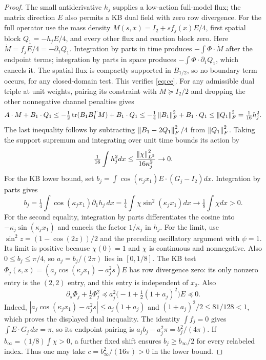 \begin{proof}
The small antiderivative $h_j$ supplies a low-action full-model flux;
the matrix direction $E$ also permits a KB dual field with zero row divergence.
For the full operator use the mass density $M(s,x)=I_2+s f_j(x)E/4$, first spatial block
$Q_1=-h_jE/4$, and every other flux and reaction block zero. Here
$\dot M=f_jE/4=-\partial_1Q_1$. Integration by parts in time produces
$-\int\Phi\cdot\dot M$ after the endpoint terms; integration by parts in
space produces $-\int\Phi\cdot\partial_1Q_1$, which cancels it. The
spatial flux is compactly supported in $B_{1/2}$, so no boundary term
occurs, for any closed-domain test. This verifies \eqref{eq:ce}.
For any admissible dual triple at unit weights, pairing its constraint
with $M\succeq I_2/2$ and dropping the other nonnegative channel penalties
gives
\[
 A\cdot M+B_1\cdot Q_1
 \le-\tfrac12\operatorname{tr}(B_1B_1^TM)+B_1\cdot Q_1
 \le-\tfrac14\left\lVert B_1\right\rVert_F^2+B_1\cdot Q_1
 \le\left\lVert Q_1\right\rVert_F^2=\tfrac1{16}h_j^2.
\]
The last inequality follows by subtracting
$\left\lVert B_1-2Q_1\right\rVert_F^2/4$ from $\left\lVert Q_1\right\rVert_F^2$.
Taking the support supremum and integrating over unit time bounds its action by
\[
 \tfrac1{16}\int h_j^2dx
 \le\frac{\left\lVert \chi\right\rVert_{L^2}^2}{16\kappa_j^2}\to0.
\]
For the KB lower bound, set
$b_j=\int\cos(\kappa_jx_1)E\cdot(G_j-I_2)dx$. Integration by parts gives
\[
 b_j=\tfrac14\int\cos(\kappa_jx_1)\partial_1h_j\,dx
     =\tfrac14\int\chi\sin^2(\kappa_jx_1)dx
 \longrightarrow\tfrac18\int\chi dx>0.
\]
For the second equality, integration by parts differentiates the cosine
into $-\kappa_j\sin(\kappa_jx_1)$ and cancels the factor
$1/\kappa_j$ in $h_j$. For the limit, use
$\sin^2 z=(1-\cos(2z))/2$ and the preceding oscillatory argument with
$\psi=1$. Its limit is positive because $\chi(0)=1$ and $\chi$ is
continuous and nonnegative. Also $0\le b_j\le\pi/4$, so
$a_j=b_j/(2\pi)$ lies in $[0,1/8]$. The KB test
$\Phi_j(s,x)=(a_j\cos(\kappa_jx_1)-a_j^2s)E$ has row divergence zero:
its only nonzero entry is the $(2,2)$ entry, and this entry is independent
of $x_2$.
Also
\[
 \partial_s\Phi_j+\tfrac12\Phi_j^2
 \preceq a_j^2\bigl(-1+\tfrac12(1+a_j)^2\bigr)E\preceq0.
\]
Indeed, $|a_j\cos(\kappa_jx_1)-a_j^2s|\le a_j(1+a_j)$ and
$(1+a_j)^2/2\le81/128<1$, which proves the displayed dual inequality.
The identity $\int f_j=0$ gives $\int E\cdot G_j\,dx=\pi$, so its
endpoint pairing is $a_jb_j-a_j^2\pi=b_j^2/(4\pi)$. If
$b_\infty=(1/8)\int\chi>0$, a further fixed shift ensures
$b_j\ge b_\infty/2$ for every relabeled index. Thus one may take
$c=b_\infty^2/(16\pi)>0$ in the lower bound.


\end{proof}
